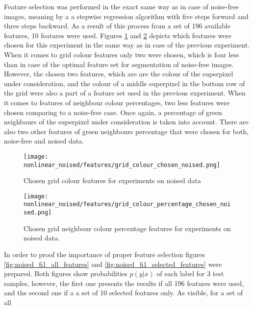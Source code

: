 Feature selection was performed in the exact same way as in case of noise-free images, meaning by a a stepwise regression algorithm with five steps forward and three steps backward. As a result of this process from a set of 196 available features, 10 features were used. Figures \ref{fig:nonlinear_noised_features_colour} and \ref{fig:nonlinear_noised_features_percentage} depicts which features were chosen for this experiment in the same way as in case of the previous experiment. When it comes to grid colour features only two were chosen, which is four less than in case of the optimal feature set for segmentation of noise-free images. However, the chosen two features, which are are the colour of the superpixel under consideration, and the colour of a middle superpixel in the bottom row of the grid were also a part of a feature set used in the previous experiment. When it comes to features of neighbour colour percentages, two less features were chosen comparing to a noise-free case. Once again, a percentage of green neighbours of the superpixel under consideration is taken into account. There are also two other features of green neighbours percentage that were chosen for both, noise-free and noised data. 
\begin{figure}
    \centering
    \texttt{[image: nonlinear\_noised/features/grid\_colour\_chosen\_noised.png]}
    \caption{Chosen grid colour features for experiments on noised data}
    \label{fig:nonlinear_noised_features_colour}
\end{figure}
\begin{figure}
    \centering
    \texttt{[image: nonlinear\_noised/features/grid\_colour\_percentage\_chosen\_noised.png]}
    \caption{Chosen grid neighbour colour percentage features for experiments on noised data.}
    \label{fig:nonlinear_noised_features_percentage}
\end{figure}




In order to proof the importance of proper feature selection figures \ref{fig:noised_fi1_all_features} and \ref{fig:noised_fi1_selected_features} were prepared. Both figures show probabilities $p(y|x)$ of each label for 3 test samples, however, the first one presents the results if all 196 features were used, and the second one if a a set of 10 selected features only. As visible, for a set of all 

